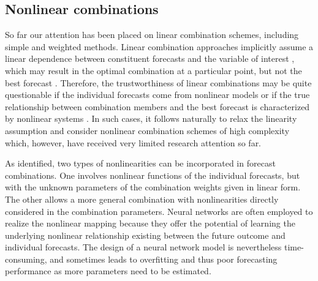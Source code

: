 \documentclass[11pt]{article}
\begin{document}
\subsection{Nonlinear combinations}
\label{sec:nonlinear_comb}

So far our attention has been placed on linear combination schemes, including simple and weighted methods. Linear combination approaches implicitly assume a linear dependence between constituent forecasts and the variable of interest \citep{Donaldson1996-um,Freitas2006-fn}, which may result in the optimal combination at a particular point, but not the best forecast \citep{Ming_Shi1999-vs}. Therefore, the trustworthiness of linear combinations may be quite questionable if the individual forecasts come from nonlinear models or if the true relationship between combination members and the best forecast is characterized by nonlinear systems \citep{Babikir2016-xz}. In such cases, it follows naturally to relax the linearity assumption and consider nonlinear combination schemes of high complexity which, however, have received very limited research attention so far.

As \citet{Timmermann2006-en} identified, two types of nonlinearities can be incorporated in forecast combinations. One involves nonlinear functions of the individual forecasts, but with the unknown parameters of the combination weights given in linear form. The other allows a more general combination with nonlinearities directly considered in the combination parameters. Neural networks are often employed to realize the nonlinear mapping because they offer the potential of learning the underlying nonlinear relationship existing between the future outcome and individual forecasts. The design of a neural network model is nevertheless time-consuming, and sometimes leads to overfitting and thus poor forecasting performance as more parameters need to be estimated.
\end{document}
